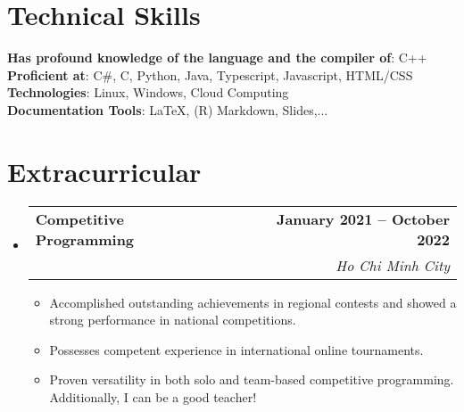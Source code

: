\documentclass[letterpaper,11pt]{article}
\makeatletter
\newcommand{\resumeItem}[1]{
\item\small{
{#1 \vspace{-2pt}}
}
}
\newcommand{\resumeSubheading}[4]{
\vspace{-2pt}\item
\begin{tabular*}{1.0\textwidth}[t]{l@{\extracolsep{\fill}}r}
\textbf{#1} & \textbf{\small #2} \\
\textit{\small#3} & \textit{\small #4} \\
    \end{tabular*}\vspace{-7pt}
}
\newcommand{\resumeSubHeadingListStart}{\begin{itemize}[leftmargin=0.0in, label={}]}
\newcommand{\resumeSubHeadingListEnd}{\end{itemize}}
\newcommand{\resumeItemListStart}{\begin{itemize}}
\newcommand{\resumeItemListEnd}{\end{itemize}\vspace{-5pt}}
\makeatother
\begin{document}
\section{Technical Skills}
\begin{itemize}[leftmargin=0.15in, label={}]
\small{\item{
\textbf{Has profound knowledge of the language and the compiler of}{: C++} \\
\textbf{Proficient at}{: C\#, C, Python, Java, Typescript, Javascript, HTML/CSS} \\
\textbf{Technologies}{: Linux, Windows, Cloud Computing} \\
\textbf{Documentation Tools}{: LaTeX, (R) Markdown, Slides,...} \\
}}
\end{itemize}
\vspace{-16pt}


\section{Extracurricular}
\resumeSubHeadingListStart
\resumeSubheading{Competitive Programming}{January 2021 -- October 2022}{}{Ho Chi Minh City}
\resumeItemListStart
\resumeItem{Accomplished outstanding achievements in regional contests and showed a strong performance in national competitions.}
\resumeItem{Possesses competent experience in international online tournaments.}
\resumeItem{Proven versatility in both solo and team-based competitive programming. Additionally, I can be a good teacher!}
\resumeItemListEnd
\resumeSubHeadingListEnd
\end{document}
